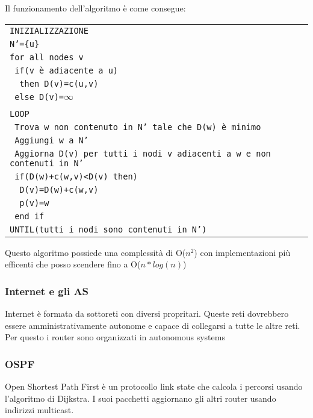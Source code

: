 \documentclass[12pt, a4paper]{article}
\begin{document}
Il funzionamento dell'algoritmo è come consegue:
\begin{center}
    
\begin{tabular}{l}
    \texttt{INIZIALIZZAZIONE}\\
    \texttt{N'=\{u\}}\\
    \texttt{for all nodes v}\\
    \texttt{ if(v è  adiacente a u)}\\
    \texttt{ \ then D(v)=c(u,v)}\\
    \texttt{ else D(v)=$\infty$   }\\\\
    \texttt{LOOP}\\
    \texttt{ Trova w non contenuto in N' tale che D(w) è  minimo}\\
    \texttt{ Aggiungi w a N'}\\
    \texttt{ Aggiorna D(v) per tutti i nodi v adiacenti a w e non contenuti in N'}\\
    \texttt{ if(D(w)+c(w,v)<D(v) then)}\\
    \texttt{ \ D(v)=D(w)+c(w,v)}\\
    \texttt{ \ p(v)=w}\\
    \texttt{ end if}\\
    \texttt{UNTIL(tutti i nodi sono contenuti in N')}\\
    \end{tabular}
\end{center}

Questo algoritmo possiede una complessità di O($n^{2}$) con implementazioni più efficenti che posso scendere fino
a O($n*log(n)$)

\subsubsection*{Internet e gli AS}
Internet è formata da sottoreti con diversi propritari. Queste reti dovrebbero essere amministrativamente autonome
e capace di collegarsi a tutte le altre reti. Per questo i router sono organizzati in autonomous systems

\subsubsection{OSPF}
Open Shortest Path First è un protocollo link state che calcola i percorsi usando l'algoritmo di Dijkstra.
I suoi pacchetti aggiornano gli altri router usando indirizzi multicast.
\end{document}
